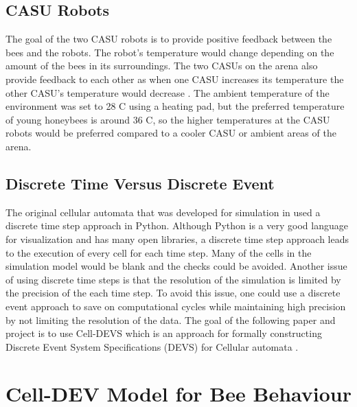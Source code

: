 \documentclass[conference,compsoc,onecolumn]{IEEEtran}
\begin{document}
\subsection{CASU Robots}

The goal of the two CASU robots is to provide positive feedback between the bees and the robots. The robot's temperature would change depending on the amount of the bees in its surroundings. The two CASUs on the arena also provide feedback to each other as when one CASU increases its temperature the other CASU's temperature would decrease \cite{Stefanc2017}. The ambient temperature of the environment was set to 28 \degree C using a heating pad, but the preferred temperature of young honeybees is around 36 \degree C, so the higher temperatures at the CASU robots would be preferred compared to a cooler CASU or ambient areas of the arena.

\subsection{Discrete Time Versus Discrete Event}

The original cellular automata that was developed for simulation in \cite{Stefanc2017} used a discrete time step approach in Python. Although Python is a very good language for visualization and has many open libraries, a discrete time step approach leads to the execution of every cell for each time step. Many of the cells in the simulation model would be blank and the checks could be avoided. Another issue of using discrete time steps is that the resolution of the simulation is limited by the precision of the each time step. To avoid this issue, one could use a discrete event approach to save on computational cycles while maintaining high precision by not limiting the resolution of the data. The goal of the following paper and project is to use Cell-DEVS which is an approach for formally constructing Discrete Event System Specifications (DEVS) for Cellular automata \cite{Wainer2009}.

\section{Cell-DEV Model for Bee Behaviour}\label{model}
\end{document}

